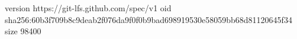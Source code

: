 version https://git-lfs.github.com/spec/v1
oid sha256:60b3f709b8c9deab2f076da9f0f0b9bad698919530e58059bb68d81120645f34
size 98400
